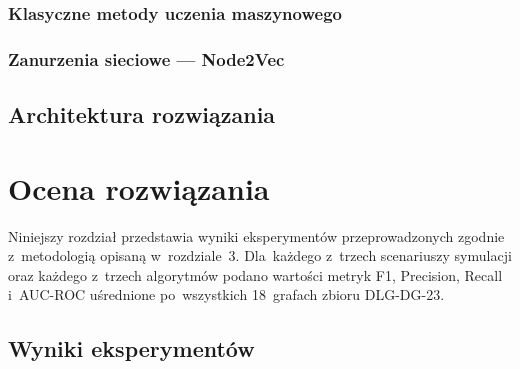 \documentclass[polish,master,a4paper,oneside]{ppfcmthesis}
\begin{document}
\subsection{Klasyczne metody uczenia maszynowego}


\subsection{Zanurzenia sieciowe — Node2Vec}


\section{Architektura rozwiązania}
\label{sec:architektura}


\chapter{Ocena rozwiązania}

Niniejszy rozdział przedstawia wyniki eksperymentów przeprowadzonych
zgodnie z~metodologią opisaną w~rozdziale~3. Dla~każdego z~trzech
scenariuszy symulacji oraz każdego z~trzech algorytmów podano wartości
metryk F1, Precision, Recall i~AUC-ROC uśrednione po~wszystkich
18~grafach zbioru DLG-DG-23.

\section{Wyniki eksperymentów}
\label{sec:wyniki}

\end{document}
